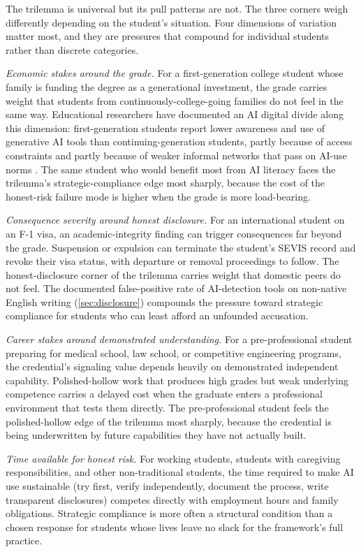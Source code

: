 \documentclass{SIAMbook2023}
\begin{document}
The trilemma is universal but its pull patterns are not. The three corners weigh differently depending on the student's situation. Four dimensions of variation matter most, and they are pressures that compound for individual students rather than discrete categories.

\textit{Economic stakes around the grade.} For a first-generation college student whose family is funding the degree as a generational investment, the grade carries weight that students from continuously-college-going families do not feel in the same way. Educational researchers have documented an AI digital divide along this dimension: first-generation students report lower awareness and use of generative AI tools than continuing-generation students, partly because of access constraints and partly because of weaker informal networks that pass on AI-use norms \citep{wgulabs2024divide}. The same student who would benefit most from AI literacy faces the trilemma's strategic-compliance edge most sharply, because the cost of the honest-risk failure mode is higher when the grade is more load-bearing.

\textit{Consequence severity around honest disclosure.} For an international student on an F-1 visa, an academic-integrity finding can trigger consequences far beyond the grade. Suspension or expulsion can terminate the student's SEVIS record and revoke their visa status, with departure or removal proceedings to follow. The honest-disclosure corner of the trilemma carries weight that domestic peers do not feel. The documented false-positive rate of AI-detection tools on non-native English writing (\cref{sec:disclosure}) compounds the pressure toward strategic compliance for students who can least afford an unfounded accusation.

\textit{Career stakes around demonstrated understanding.} For a pre-professional student preparing for medical school, law school, or competitive engineering programs, the credential's signaling value depends heavily on demonstrated independent capability. Polished-hollow work that produces high grades but weak underlying competence carries a delayed cost when the graduate enters a professional environment that tests them directly. The pre-professional student feels the polished-hollow edge of the trilemma most sharply, because the credential is being underwritten by future capabilities they have not actually built.

\textit{Time available for honest risk.} For working students, students with caregiving responsibilities, and other non-traditional students, the time required to make AI use sustainable (try first, verify independently, document the process, write transparent disclosures) competes directly with employment hours and family obligations. Strategic compliance is more often a structural condition than a chosen response for students whose lives leave no slack for the framework's full practice.
\end{document}
